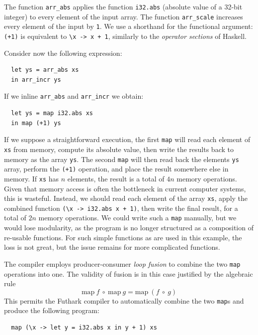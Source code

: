 The function \lstinline{arr_abs} applies the function
\lstinline{i32.abs} (absolute value of a 32-bit integer) to every
element of the input array.  The function \lstinline{arr_scale}
increases every element of the input by \lstinline{1}.  We use a
shorthand for the functional argument: \lstinline{(+1)} is equivalent
to \lstinline{\x -> x + 1}, similarly to the \textit{operator
  sections} of Haskell.

Consider now the following expression:

\begin{lstlisting}
  let ys = arr_abs xs
  in arr_incr ys
\end{lstlisting}

If we inline \lstinline{arr_abs} and \lstinline{arr_incr} we obtain:

\begin{lstlisting}
  let ys = map i32.abs xs
  in map (+1) ys
\end{lstlisting}

If we suppose a straightforward execution, the first \lstinline{map}
will read each element of \lstinline{xs} from memory, compute its
absolute value, then write the results back to memory as the array
\lstinline{ys}.  The second \lstinline{map} will then read back the
elements \lstinline{ys} array, perform the \lstinline{(+1)} operation,
and place the result somewhere else in memory.  If \lstinline{xs} has
$n$ elements, the result is a total of $4n$ memory operations.  Given
that memory access is often the bottleneck in current computer
systems, this is wasteful.  Instead, we should read each element of
the array \lstinline{xs}, apply the combined function \lstinline{(\x -> i32.abs x + 1)}, then write the final result, for a total of $2n$
memory operations.  We could write such a \lstinline{map} manually,
but we would lose modularity, as the program is no longer structured
as a composition of re-usable functions.  For such simple functions as
are used in this example, the loss is not great, but the issue remains
for more complicated functions.

The compiler employs producer-consumer \textit{loop fusion} to combine
the two \lstinline{map} operations into one.  The validity of fusion
is in this case justified by the algebraic rule
\[
  \text{map}~f~\circ~\text{map}~g=\text{map}~(f~\circ~g)
\]
This permits the Futhark compiler to automatically combine the two
\lstinline{map}s and produce the following program:

\begin{lstlisting}
  map (\x -> let y = i32.abs x in y + 1) xs
\end{lstlisting}

